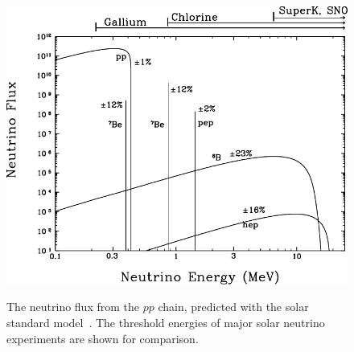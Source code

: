 \begin{figure}
	\begin{minipage}[t]{0.48\textwidth}
		\includegraphics[width=\textwidth]{pics/BahcallNuFlux.pdf}
		\caption{The neutrino flux from the $pp$ chain, predicted with the solar standard model~\cite{Bahcall:2004mz}.
			The threshold energies of major solar neutrino experiments are shown for comparison.}
		\label{fig:solar_nu_flux}
	\end{minipage}
	\hfill
	\begin{minipage}[t]{0.5\textwidth}
		\centering
		\label{fig:borex}
	\end{minipage}
\end{figure}


